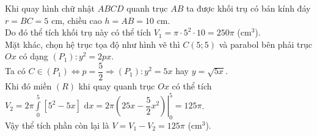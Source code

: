 \begin{ex}
{\begin{center}
	\end{center}
	Khi quay hình chữ nhật $ABCD$ quanh trục $AB$ ta được khối trụ có bán kính đáy $r=BC=5$ cm, chiều cao $h=AB=10$ cm.\\
	Do đó thể tích khối trụ này có thể tích $V_1=\pi \cdot 5^2\cdot 10=250\pi$ (cm$^3$).\\
	Mặt khác, chọn hệ trục tọa độ như hình vẽ thì $C(5;5)$ và parabol bên phải trục $Ox$ có dạng $(P_1)\colon y^2=2px$.\\
	Ta có $C\in (P_1)\Leftrightarrow p=\dfrac{5}{2}
	\Rightarrow (P_1)\colon y^2=5x$ hay $y=\sqrt{5x}$.\\
	Khi đó miền $(R)$ khi quay quanh trục $Ox$ có thể tích $V_2=2\pi \displaystyle \int\limits_0^5 \left[ {5^2}-5x \right]\,\mathrm{\,d}x=2\pi \left. \left( 25x-\dfrac{5}{2}{x^2} \right) \right|_0^5=125\pi $.\\
	Vậy thể tích phần còn lại là $V=V_1-V_2=125\pi$ (cm$^3$).\\
}
	\end{ex}

